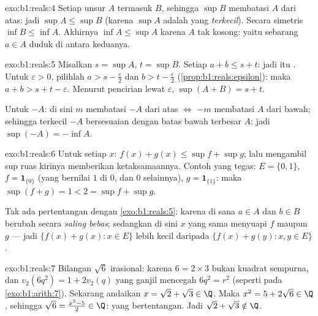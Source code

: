 \begin{solution}{exo:b1:reals:4}
Setiap unsur $A$ termasuk $B$, sehingga $\sup B$ membatasi $A$ dari atas:
jadi $\sup A \leq \sup B$ (karena $\sup A$ adalah  yang
\emph{terkecil}). Secara simetris $\inf B \leq \inf A$. Akhirnya $\inf A \leq
\sup A$ karena $A$ tak kosong: yaitu sebarang $a \in A$ duduk di antara keduanya.
\end{solution}

\begin{solution}{exo:b1:reals:5}
Misalkan $s = \sup A$, $t = \sup B$. Setiap $a + b \leq s + t$: jadi itu . Untuk $\varepsilon > 0$, pilihlah $a > s - \frac\varepsilon2$ dan
$b > t - \frac\varepsilon2$ (\cref{prop:b1:reals:epsilon}): maka $a +
b > s + t - \varepsilon$. Menurut pencirian lewat $\varepsilon$,
$\sup(A+B) = s + t$.

Untuk $-A$: di sini $m$ membatasi $-A$ dari atas $\iff$ $-m$ membatasi $A$ dari bawah;
sehingga  terkecil $-A$ bersesuaian dengan batas bawah
terbesar $A$: jadi $\sup(-A) = -\inf A$.
\end{solution}

\begin{solution}{exo:b1:reals:6}
Untuk setiap $x$: $f(x) + g(x) \leq \sup f + \sup g$; lalu mengambil sup
ruas kirinya memberikan ketaksamaannya. Contoh yang tegas: $E = \{0, 1\}$,
$f = \mathbf{1}_{\{0\}}$ (yang bernilai $1$ di $0$, dan $0$ selainnya), $g =
\mathbf{1}_{\{1\}}$: maka $\sup(f + g) = 1 < 2 = \sup f + \sup g$.

Tak ada pertentangan dengan \cref{exo:b1:reals:5}: karena di sana $a \in A$ dan $b
\in B$ berubah secara \emph{saling bebas}; sedangkan di sini $x$ yang sama menyuapi $f$
maupun $g$ --- jadi  $\{f(x) + g(x) : x \in E\}$ lebih kecil daripada
 $\{f(x) + g(y) : x, y \in E\}$.
\end{solution}

\begin{solution}{exo:b1:reals:7}
Bilangan $\sqrt 6$ irasional: karena $6 = 2 \times 3$ bukan kuadrat sempurna,
dan $v_2(6q^2) = 1 + 2v_2(q)$ yang ganjil mencegah $6q^2 = r^2$ (seperti pada
\cref{exo:b1:arith:7}). Sekarang andaikan $x = \sqrt 2 + \sqrt 3 \in \Q$.
Maka $x^2 = 5 + 2\sqrt 6 \in \Q$, sehingga $\sqrt 6 = \frac{x^2 - 5}{2} \in
\Q$: yang bertentangan. Jadi $\sqrt 2 + \sqrt 3 \notin \Q$.
\end{solution}

